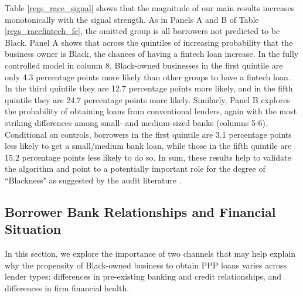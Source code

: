 \documentclass[11pt]{article}
\begin{document}
Table \ref{regs_race_signal} shows that the magnitude of our main results increases monotonically with the signal strength. As in Panels A and B of Table \ref{regs_racefintech_fe}, the omitted group is all borrowers not predicted to be Black. Panel A shows that across the quintiles of increasing probability that the business owner is Black, the chances of having a fintech loan increase. In the fully controlled model in column 8, Black-owned businesses in the first quintile are only 4.3 percentage points more likely than other groups to have a fintech loan. In the third quintile they are 12.7 percentage points more likely, and in the fifth quintile they are 24.7 percentage points more likely. Similarly, Panel B explores the probability of obtaining loans from conventional lenders, again with the most striking differences among small- and medium-sized banks (columns 5-6). Conditional on controls, borrowers in the first quintile are 3.1 percentage points less likely to get a small/medium bank loan, while those in the fifth quintile are 15.2 percentage points less likely to do so. In sum, these results help to validate the algorithm and point to a potentially important role for the degree of ``Blackness" as suggested by the audit literature \citep{bertrand2004emily}.



\subsection{Borrower Bank Relationships and Financial Situation}\label{analysis_bank}

In this section, we explore the importance of two channels that may help explain why the propensity of Black-owned business to obtain PPP loans varies across lender types: differences in pre-existing banking and credit relationships, and differences in firm financial health.
\end{document}
